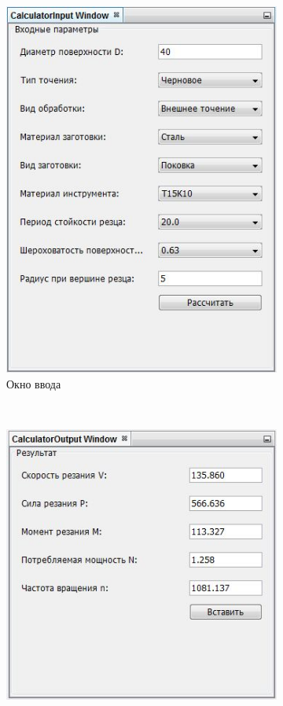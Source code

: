 \documentclass[14pt,oneside,final]{extreport}
\begin{document}
	\begin{figure}[h!]
		\centering
		\begin{subfigure}[t]{0.5\textwidth}
			\centering
			\includegraphics[width=1\textwidth]{img/calc-input-screen}
			\caption{Окно ввода} \label{fig:calc-input-screen}
		\end{subfigure}%
		~ 
		\begin{subfigure}[t]{0.5\textwidth}
			\centering
			\includegraphics[width=1\textwidth]{img/calc-output-screen} 

\end{subfigure}
\end{figure}
\end{document}
